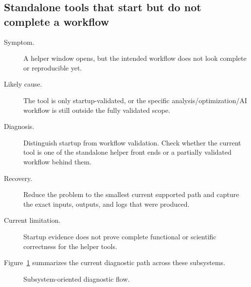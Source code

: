 \subsection{Standalone tools that start but do not complete a workflow}
\label{subsec:troubleshooting-tools}

\begin{description}
\item[Symptom.] A helper window opens, but the intended workflow does not look
complete or reproducible yet.
\item[Likely cause.] The tool is only startup-validated, or the specific
analysis/optimization/AI workflow is still outside the fully validated scope.
\item[Diagnosis.] Distinguish startup from workflow validation. Check whether
the current tool is one of the standalone helper front ends or a partially
validated workflow behind them.
\item[Recovery.] Reduce the problem to the smallest current supported path and
capture the exact inputs, outputs, and logs that were produced.
\item[Current limitation.] Startup evidence does not prove complete functional
or scientific correctness for the helper tools.
\end{description}

Figure~\ref{fig:troubleshooting-diagnostic-flow} summarizes the current
diagnostic path across these subsystems.

\begin{figure}[htbp]
\centering
\caption{Subsystem-oriented diagnostic flow.}
\label{fig:troubleshooting-diagnostic-flow}
\end{figure}

